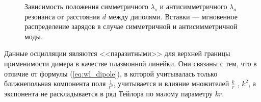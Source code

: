 \begin{figure}
\caption{Зависимость положения симметричного $ \lambda_s $ и антисимметричного $ \lambda_a $ резонанса от расстояния $ d $ между диполями. Вставки --- мгновенное распределение зарядов в случае симметричной и антисимметричной моды.}
\label{img:2D_res}
\end{figure}
Данные осцилляции являются <<паразитными>> для верхней границы применимости димера в качестве плазмонной линейки. Они связаны с тем, что в отличие от формулы (\ref{eq:wl_dipole}), в которой учитывалась только ближнепольная компонента поля $ \frac{1}{r^2} $, учитывается и влияние множителей $ \frac{k}{r} $ , $ k^2 $, а экспонента не раскладывается в ряд Тейлора по малому параметру $ kr $.

